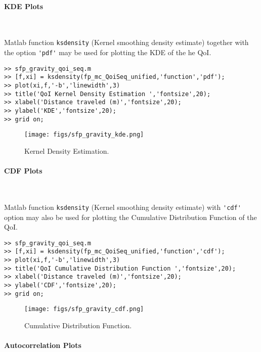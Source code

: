\paragraph{KDE Plots} \

Matlab function \verb+ksdensity+ (Kernel smoothing density estimate) together with the option \verb+'pdf'+ may be used for plotting the KDE of the he QoI.
\begin{lstlisting}[label=matlab:kde_qoi,caption={Matlab code for the QoI KDE plot.}]
% inside Matlab
>> sfp_gravity_qoi_seq.m
>> [f,xi] = ksdensity(fp_mc_QoiSeq_unified,'function','pdf');
>> plot(xi,f,'-b','linewidth',3)
>> title('QoI Kernel Density Estimation ','fontsize',20);
>> xlabel('Distance traveled (m)','fontsize',20);
>> ylabel('KDE','fontsize',20);
>> grid on;
\end{lstlisting}

\begin{figure}[p]
\centering 
\texttt{[image: figs/sfp\_gravity\_kde.png]}
\vspace*{-10pt}
\caption{Kernel Density Estimation.}
\label{fig:sfp_gravity_kde}
\end{figure}

\newpage

\paragraph{CDF Plots} \

Matlab function \verb+ksdensity+ (Kernel smoothing density estimate) with \verb+'cdf'+ option may also be used for plotting the Cumulative Distribution Function of the QoI.

\begin{lstlisting}[label=matlab:cdf_qoi,caption={Matlab code for the QoI CDF plot.}]
% inside Matlab
>> sfp_gravity_qoi_seq.m
>> [f,xi] = ksdensity(fp_mc_QoiSeq_unified,'function','cdf');
>> plot(xi,f,'-b','linewidth',3)
>> title('QoI Cumulative Distribution Function ','fontsize',20);
>> xlabel('Distance traveled (m)','fontsize',20);
>> ylabel('CDF','fontsize',20);
>> grid on;
\end{lstlisting}

\begin{figure}[p]
\centering 
\texttt{[image: figs/sfp\_gravity\_cdf.png]}
\vspace*{-10pt}
\caption{Cumulative Distribution Function.}
\label{fig:sfp_gravity_cdf}
\end{figure}

\paragraph{Autocorrelation Plots} \

